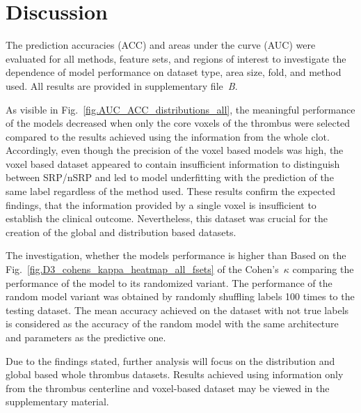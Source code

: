 \documentclass[preprint,12pt]{elsarticle}
\begin{document}






\section{Discussion}

The prediction accuracies (ACC) and areas under the curve (AUC) were evaluated for all methods, feature sets, and regions of interest to investigate the dependence of model performance on dataset type, area size, fold, and method used. All results are provided in supplementary file~\textit{B}. 



As visible in Fig.~\ref{fig.AUC_ACC_distributions_all}, the meaningful performance of the models decreased when only the core voxels of the thrombus were selected compared to the results achieved using the information from the whole clot. Accordingly, even though the precision of the voxel based models was high, the voxel based dataset appeared to contain insufficient information to distinguish between SRP/nSRP and led to model underfitting with the prediction of the same label regardless of the method used. These results confirm the expected findings, that the information provided by a single voxel is insufficient to establish the clinical outcome. Nevertheless, this dataset was crucial for the creation of the global and distribution based datasets.

The investigation, whether the models performance is higher than  Based on the Fig.~\ref{fig.D3_cohens_kappa_heatmap_all_fsets} of the Cohen's~$\kappa$ comparing the performance of the model to its randomized variant. The performance of the random model variant was obtained by randomly shuffling labels 100 times to the testing dataset. The mean accuracy achieved on the dataset with not true labels is considered as the accuracy of the random model with the same architecture and parameters as the predictive one. 



Due to the findings stated, further analysis will focus on the distribution and global based whole thrombus datasets. Results achieved using information only from the thrombus centerline and voxel-based dataset may be viewed in the supplementary material.  
\end{document}
